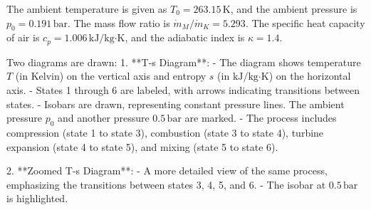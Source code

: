 The ambient temperature is given as \( T_0 = 263.15 \, \text{K} \), and the ambient pressure is \( p_0 = 0.191 \, \text{bar} \). The mass flow ratio is \( \dot{m}_M / \dot{m}_K = 5.293 \). The specific heat capacity of air is \( c_p = 1.006 \, \text{kJ/kg·K} \), and the adiabatic index is \( \kappa = 1.4 \).

Two diagrams are drawn:  
1. **T-s Diagram**:  
   - The diagram shows temperature \( T \) (in Kelvin) on the vertical axis and entropy \( s \) (in \( \text{kJ/kg·K} \)) on the horizontal axis.  
   - States 1 through 6 are labeled, with arrows indicating transitions between states.  
   - Isobars are drawn, representing constant pressure lines. The ambient pressure \( p_0 \) and another pressure \( 0.5 \, \text{bar} \) are marked.  
   - The process includes compression (state 1 to state 3), combustion (state 3 to state 4), turbine expansion (state 4 to state 5), and mixing (state 5 to state 6).  

2. **Zoomed T-s Diagram**:  
   - A more detailed view of the same process, emphasizing the transitions between states 3, 4, 5, and 6.  
   - The isobar at \( 0.5 \, \text{bar} \) is highlighted.